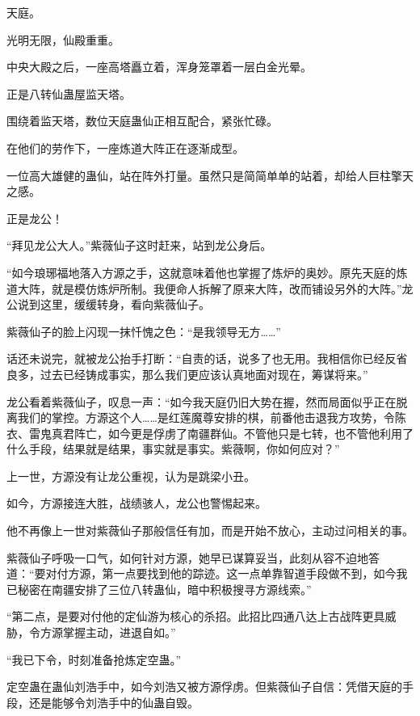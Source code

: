 
\begin{this_body}



天庭。

光明无限，仙殿重重。

中央大殿之后，一座高塔矗立着，浑身笼罩着一层白金光晕。

正是八转仙蛊屋监天塔。

围绕着监天塔，数位天庭蛊仙正相互配合，紧张忙碌。

在他们的劳作下，一座炼道大阵正在逐渐成型。

一位高大雄健的蛊仙，站在阵外打量。虽然只是简简单单的站着，却给人巨柱擎天之感。

正是龙公！

“拜见龙公大人。”紫薇仙子这时赶来，站到龙公身后。

“如今琅琊福地落入方源之手，这就意味着他也掌握了炼炉的奥妙。原先天庭的炼道大阵，就是模仿炼炉所制。我便命人拆解了原来大阵，改而铺设另外的大阵。”龙公说到这里，缓缓转身，看向紫薇仙子。

紫薇仙子的脸上闪现一抹忏愧之色：“是我领导无方……”

话还未说完，就被龙公抬手打断：“自责的话，说多了也无用。我相信你已经反省良多，过去已经铸成事实，那么我们更应该认真地面对现在，筹谋将来。”

龙公看着紫薇仙子，叹息一声：“如今我天庭仍旧大势在握，然而局面似乎正在脱离我们的掌控。方源这个人……是红莲魔尊安排的棋，前番他击退我方攻势，令陈衣、雷鬼真君阵亡，如今更是俘虏了南疆群仙。不管他只是七转，也不管他利用了什么手段，结果就是结果，事实就是事实。紫薇啊，你如何应对？”

上一世，方源没有让龙公重视，认为是跳梁小丑。

如今，方源接连大胜，战绩骇人，龙公也警惕起来。

他不再像上一世对紫薇仙子那般信任有加，而是开始不放心，主动过问相关的事。

紫薇仙子呼吸一口气，如何针对方源，她早已谋算妥当，此刻从容不迫地答道：“要对付方源，第一点要找到他的踪迹。这一点单靠智道手段做不到，如今我已秘密在南疆安排了三位八转蛊仙，暗中积极搜寻方源线索。”

“第二点，是要对付他的定仙游为核心的杀招。此招比四通八达上古战阵更具威胁，令方源掌握主动，进退自如。”

“我已下令，时刻准备抢炼定空蛊。”

定空蛊在蛊仙刘浩手中，如今刘浩又被方源俘虏。但紫薇仙子自信：凭借天庭的手段，还是能够令刘浩手中的仙蛊自毁。


\end{this_body}
